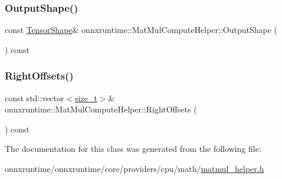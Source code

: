 \subsubsection{\texorpdfstring{Output\+Shape()}{OutputShape()}}
{\footnotesize\ttfamily const \mbox{\hyperlink{classonnxruntime_1_1TensorShape}{Tensor\+Shape}}\& onnxruntime\+::\+Mat\+Mul\+Compute\+Helper\+::\+Output\+Shape (\begin{DoxyParamCaption}{ }\end{DoxyParamCaption}) const\hspace{0.3cm}{\ttfamily [inline]}}

\mbox{\label{classonnxruntime_1_1MatMulComputeHelper_aac21fe3b8c93d9c3ec5a20b0f629d70c}} 
\subsubsection{\texorpdfstring{Right\+Offsets()}{RightOffsets()}}
{\footnotesize\ttfamily const std\+::vector$<$\mbox{\hyperlink{mlasi_8h_a503efbc1c6e50825320ad909366b78ab}{size\+\_\+t}}$>$\& onnxruntime\+::\+Mat\+Mul\+Compute\+Helper\+::\+Right\+Offsets (\begin{DoxyParamCaption}{ }\end{DoxyParamCaption}) const\hspace{0.3cm}{\ttfamily [inline]}}



The documentation for this class was generated from the following file\+:\begin{DoxyCompactItemize}
\item 
onnxruntime/onnxruntime/core/providers/cpu/math/\mbox{\hyperlink{matmul__helper_8h}{matmul\+\_\+helper.\+h}}\end{DoxyCompactItemize}

